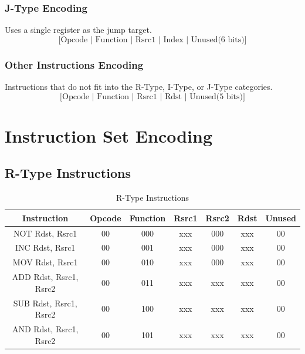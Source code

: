 \documentclass{report}
\begin{document}
\subsection*{J-Type Encoding}
Uses a single register as the jump target.
\[
\text{[Opcode | Function | Rsrc1 | Index | Unused(6 bits)]}
\]

\subsection*{Other Instructions Encoding}
Instructions that do not fit into the R-Type, I-Type, or J-Type categories.
\[
\text{[Opcode | Function | Rsrc1 | Rdst | Unused(5 bits)]}
\]


\chapter{Instruction Set Encoding}

\section*{R-Type Instructions}
\begin{table}[H]
    \centering
    \begin{tabular}{|c|c|c|c|c|c|c|}
    \hline
    \textbf{Instruction} & \textbf{Opcode} & \textbf{Function} & \textbf{Rsrc1} & \textbf{Rsrc2} & \textbf{Rdst} & \textbf{Unused} \\ \hline
    NOT Rdst, Rsrc1 & 00 & 000 & xxx & \cellcolor{red!20}000 & xxx & \cellcolor{red!20}00 \\ \hline
    INC Rdst, Rsrc1 & 00 & 001 & xxx & \cellcolor{red!20}000 & xxx & \cellcolor{red!20}00 \\ \hline
    MOV Rdst, Rsrc1 & 00 & 010 & xxx & \cellcolor{red!20}000 & xxx & \cellcolor{red!20}00 \\ \hline
    ADD Rdst, Rsrc1, Rsrc2 & 00 & 011 & xxx & xxx & xxx & \cellcolor{red!20}00 \\ \hline
    SUB Rdst, Rsrc1, Rsrc2 & 00 & 100 & xxx & xxx & xxx & \cellcolor{red!20}00 \\ \hline
    AND Rdst, Rsrc1, Rsrc2 & 00 & 101 & xxx & xxx & xxx & \cellcolor{red!20}00 \\ \hline
    \end{tabular}
    \caption{R-Type Instructions}
    \label{tab:r-type}
\end{table}
\end{document}
